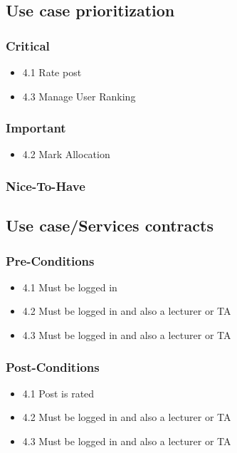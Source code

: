 \documentclass[hidelinks, 12pt, oneside]{article}
\begin{document}
\subsection{Use case prioritization}
\subsubsection{Critical}
\begin{itemize}
  \item 4.1 Rate post
  \item 4.3 Manage User Ranking
\end{itemize}

\subsubsection{Important}
\begin{itemize}
  \item 4.2 Mark Allocation
\end{itemize}
\subsubsection{Nice-To-Have}


\subsection{Use case/Services contracts}
\subsubsection{Pre-Conditions}								%
\begin{itemize}
  \item 4.1 Must be logged in
  \item 4.2 Must be logged in and also a lecturer or TA
  \item 4.3 Must be logged in and also a lecturer or TA
\end{itemize}

\subsubsection{Post-Conditions}%
\begin{itemize}
  \item 4.1 Post is rated
  \item 4.2 Must be logged in and also a lecturer or TA
  \item 4.3 Must be logged in and also a lecturer or TA
\end{itemize}
\end{document}
